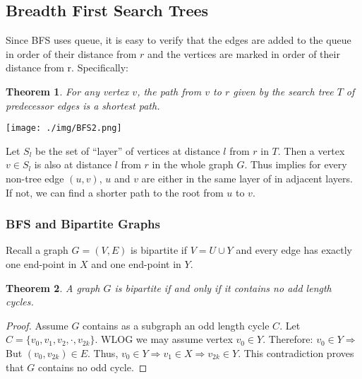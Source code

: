 \documentclass[11pt, a4paper, oneside]{book}
\theoremstyle{theoremdd}
\newtheorem{theorem}{Theorem}[chapter]
\theoremstyle{remark}
\begin{document}
\subsection*{Breadth First Search Trees}
Since BFS uses queue, it is easy to verify that the edges are added to the queue in order of their distance from $r$ and the vertices are marked in order of their distance from r. Specifically:
\begin{theorem}
For any vertex $v$, the path from $v$ to $r$ given by the search tree $T$ of predecessor edges is a shortest path. 
\end{theorem}
\begin{center}
\texttt{[image: ./img/BFS2.png]}
\end{center}
Let $S_{l}$ be the set of ``layer'' of vertices at distance $l$ from $r$ in $T$. Then a vertex $v\in S_{l}$ is also at distance $l$ from $r$ in the whole graph $G$. Thus implies for every non-tree edge $(u,v)$, $u$ and $v$ are either in the same layer of in adjacent layers. If not, we can find a shorter path to the root from $u$ to $v$. 

\subsubsection*{BFS and Bipartite Graphs}
Recall a graph $G=(V,E)$ is bipartite if $V=U\cup Y$ and every edge has exactly one end-point in $X$ and one end-point in $Y$.
\begin{theorem}
A graph $G$ is bipartite if and only if it contains no add length cycles.
\end{theorem}
\begin{proof}
Assume $G$ contains as a subgraph an odd length cycle $C$. Let $C=\{v_{0},v_{1},v_{2},\cdot,v_{2k}\}$. WLOG we may assume vertex $v_{0}\in Y$. Therefore: $v_{0}\in Y \Rightarrow $ But $(v_{0},v_{2k})\in E$. Thus, $v_{0}\in Y \Rightarrow v_{1}\in X \Rightarrow v_{2k}\in Y$. This contradiction proves that $G$ contains no odd cycle. 
\end{proof}


\pagebreak
\end{document}
